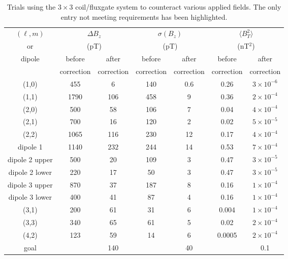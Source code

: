 \documentclass[preprint,12pt]{elsarticle}
\begin{document}
\begin{table}
  \begin{center}
    \begin{tabular}{ccccccc}
      $(\ell,m)$ & \multicolumn{2}{c}{$\Delta B_z$} & \multicolumn{2}{c}{$\sigma(B_z)$} & \multicolumn{2}{c}{$\langle B_T^2\rangle$}\\
      or &  \multicolumn{2}{c}{(pT)} & \multicolumn{2}{c}{(pT)} & \multicolumn{2}{c}{(nT$^2$)} \\\cline{2-7}
      dipole & before & after & before & after & before & after \\
      & correction & correction & correction & correction & correction & correction \\\hline
      (1,0) & 455 &  6 & 140 & 0.6 & 0.26 & $3\times 10^{-6}$ \\
      (1,1) &1790 &106 & 458 & 9 & 0.36 & $2\times 10^{-4}$ \\
      (2,0) & 500 & 58 & 106 & 7 & 0.04 & $4\times 10^{-4}$ \\
      (2,1) & 700 & 16 & 120 & 2 & 0.02 & $5\times 10^{-5}$ \\
      (2,2) &1065 &116 & 230 &12 & 0.17 & $4\times 10^{-4}$ \\
      dipole 1 &1140&$\boxed{232}$ & 244 &14 & 0.53 & $7\times 10^{-4}$ \\
      dipole 2 upper&500& 20 & 109 & 3 & 0.47 & $3\times 10^{-5}$ \\
      dipole 2 lower&220& 17 &  50 & 3 & 0.47 & $3\times 10^{-5}$ \\
      dipole 3 upper&870& 37 & 187 & 8 & 0.16 & $1\times 10^{-4}$ \\
      dipole 3 lower&400& 41 &  87 & 4 & 0.16 & $1\times 10^{-4}$ \\
      (3,1) & 200 & 61 &  31 & 6 & 0.004& $1\times 10^{-4}$ \\
      (3,3) & 340 & 65 &  61 & 5 & 0.02 & $2\times 10^{-4}$ \\
      (4,2) & 123 & 59 &  14 & 6 & 0.0005&$2\times 10^{-4}$ \\
      \hline
      goal & & 140 & & 40 & & 0.1 \\
    \end{tabular}
    \caption{Trials using the $3\times 3$ coil/fluxgate system to
      counteract various applied fields.  The only entry not meeting
      requirements has been highlighted.\label{tab:trials}}
  \end{center}
\end{table}
\end{document}
